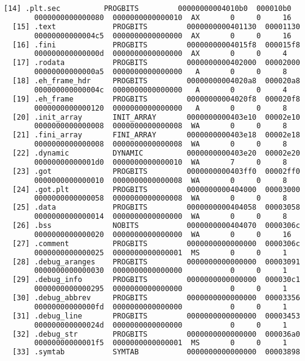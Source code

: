 \begin{lstlisting}[language=bash, caption={List of ELF section headers with readelf tool of a program compiled with GCC.}, label={code:elf_sections}]
  [14] .plt.sec          PROGBITS         00000000004010b0  000010b0
       0000000000000080  0000000000000010  AX       0     0     16
  [15] .text             PROGBITS         0000000000401130  00001130
       00000000000004c5  0000000000000000  AX       0     0     16
  [16] .fini             PROGBITS         00000000004015f8  000015f8
       000000000000000d  0000000000000000  AX       0     0     4
  [17] .rodata           PROGBITS         0000000000402000  00002000
       00000000000000a5  0000000000000000   A       0     0     8
  [18] .eh_frame_hdr     PROGBITS         00000000004020a8  000020a8
       000000000000004c  0000000000000000   A       0     0     4
  [19] .eh_frame         PROGBITS         00000000004020f8  000020f8
       0000000000000120  0000000000000000   A       0     0     8
  [20] .init_array       INIT_ARRAY       0000000000403e10  00002e10
       0000000000000008  0000000000000008  WA       0     0     8
  [21] .fini_array       FINI_ARRAY       0000000000403e18  00002e18
       0000000000000008  0000000000000008  WA       0     0     8
  [22] .dynamic          DYNAMIC          0000000000403e20  00002e20
       00000000000001d0  0000000000000010  WA       7     0     8
  [23] .got              PROGBITS         0000000000403ff0  00002ff0
       0000000000000010  0000000000000008  WA       0     0     8
  [24] .got.plt          PROGBITS         0000000000404000  00003000
       0000000000000058  0000000000000008  WA       0     0     8
  [25] .data             PROGBITS         0000000000404058  00003058
       0000000000000014  0000000000000000  WA       0     0     8
  [26] .bss              NOBITS           0000000000404070  0000306c
       0000000000000020  0000000000000000  WA       0     0     16
  [27] .comment          PROGBITS         0000000000000000  0000306c
       0000000000000025  0000000000000001  MS       0     0     1
  [28] .debug_aranges    PROGBITS         0000000000000000  00003091
       0000000000000030  0000000000000000           0     0     1
  [29] .debug_info       PROGBITS         0000000000000000  000030c1
       0000000000000295  0000000000000000           0     0     1
  [30] .debug_abbrev     PROGBITS         0000000000000000  00003356
       00000000000000fd  0000000000000000           0     0     1
  [31] .debug_line       PROGBITS         0000000000000000  00003453
       000000000000024d  0000000000000000           0     0     1
  [32] .debug_str        PROGBITS         0000000000000000  000036a0
       00000000000001f5  0000000000000001  MS       0     0     1
  [33] .symtab           SYMTAB           0000000000000000  00003898

\end{lstlisting}
